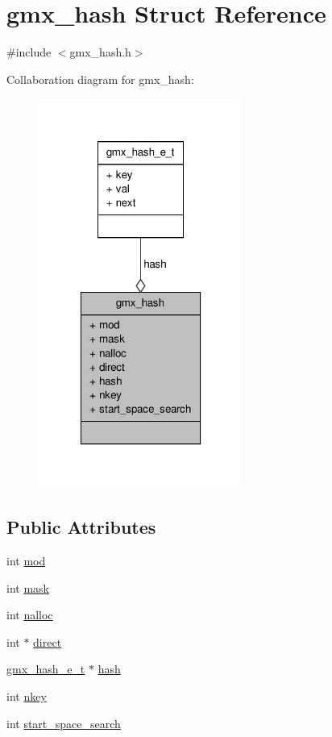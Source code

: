 \hypertarget{structgmx__hash}{\section{gmx\-\_\-hash \-Struct \-Reference}
\label{structgmx__hash}
}


{\ttfamily \#include $<$gmx\-\_\-hash.\-h$>$}



\-Collaboration diagram for gmx\-\_\-hash\-:
\nopagebreak
\begin{figure}[H]
\begin{center}
\leavevmode
\includegraphics[width=190pt]{structgmx__hash__coll__graph}
\end{center}
\end{figure}
\subsection*{\-Public \-Attributes}
\begin{DoxyCompactItemize}
\item 
int \hyperlink{structgmx__hash_afca27eec49c47806ebd4894afa0a788d}{mod}
\item 
int \hyperlink{structgmx__hash_a330f012736c300c6aa5365de9a28088d}{mask}
\item 
int \hyperlink{structgmx__hash_a256532b2084c2e332cc7b3328265d143}{nalloc}
\item 
int $\ast$ \hyperlink{structgmx__hash_a4421dc74efccb5a2d3e2bcac6691492c}{direct}
\item 
\hyperlink{structgmx__hash__e__t}{gmx\-\_\-hash\-\_\-e\-\_\-t} $\ast$ \hyperlink{structgmx__hash_a0ba6094d98a2cfc544071a2d800a0da3}{hash}
\item 
int \hyperlink{structgmx__hash_ac4fe44d7798f511c17de4666e5b24e76}{nkey}
\item 
int \hyperlink{structgmx__hash_a3727ea6c180523c5a1bffed1e45bffaa}{start\-\_\-space\-\_\-search}
\end{DoxyCompactItemize}


